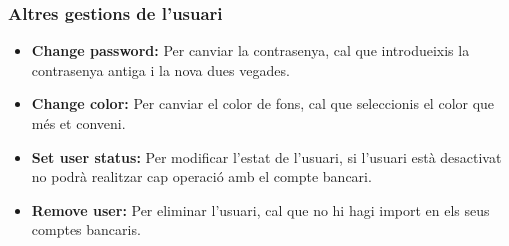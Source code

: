 \documentclass[a4paper,12pt,twoside]{ThesisStyle}
\begin{document}
\subsubsection{Altres gestions de l'usuari}
\label{subsubsec:Gestió de l'usuari}

\begin{itemize}
    \item \textbf{Change password:} Per canviar la contrasenya, cal que introdueixis la contrasenya antiga i la nova dues vegades.
    \item \textbf{Change color:} Per canviar el color de fons, cal que seleccionis el color que més et conveni.
    \item \textbf{Set user status:} Per modificar l'estat de l'usuari, si l'usuari està desactivat no podrà realitzar cap operació amb el compte bancari.
    \item \textbf{Remove user:} Per eliminar l'usuari, cal que no hi hagi import en els seus comptes bancaris.
\end{itemize}
\end{document}
